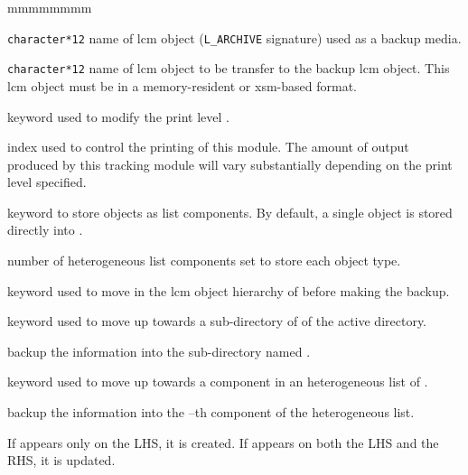 \begin{ListeDeDescription}{mmmmmmmm}

\item[\dusa{NAME1}] {\tt character*12} name of {\sc lcm} object ({\tt L\_ARCHIVE} signature) used as a backup media.

\item[\dusa{NAME2}] {\tt character*12} name of {\sc lcm} object
to be transfer to the backup {\sc lcm} object. This {\sc lcm} object must be in a
memory-resident or {\sc xsm}-based format.

\item[\moc{EDIT}] keyword used to modify the print level .

\item[\dusa{iprint}] index used to control the printing of this module. The
amount of output produced by this tracking module will vary substantially
depending on the print level specified.

\item[\moc{LIST}] keyword to store  objects as list components. By default, a single  object is stored directly into .

\item[\dusa{ndim}] number of heterogeneous list components set to store each  object type.

\item[\moc{STEP}] keyword used to move in the {\sc lcm} object hierarchy of  before making the backup.

\item[\moc{UP}] keyword used to move up towards a sub-directory of  of the
active directory.

\item[\dusa{NOMDIR}] backup the information into the sub-directory named .

\item[\moc{AT}] keyword used to move up towards a component in an heterogeneous list of .

\item[\dusa{index}] backup the information into the --th component of the heterogeneous list.

\end{ListeDeDescription}

If  appears only on the LHS, it is created. If 
appears on both the LHS and the RHS, it is updated.


